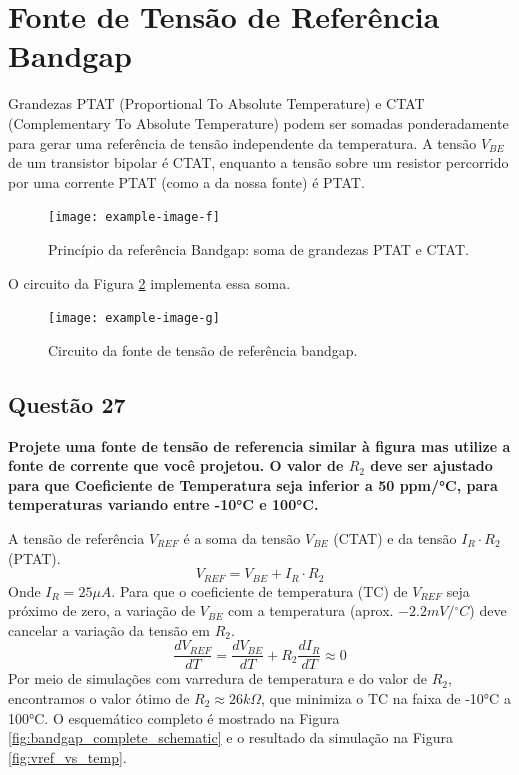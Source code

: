 ﻿\documentclass[12pt,a4paper]{article}
\newcommand{\degree}{\ensuremath{{}^\circ}}
\begin{document}
\section*{Fonte de Tensão de Referência Bandgap}

Grandezas PTAT (Proportional To Absolute Temperature) e CTAT (Complementary To Absolute Temperature) podem ser somadas ponderadamente para gerar uma referência de tensão independente da temperatura. A tensão $V_{BE}$ de um transistor bipolar é CTAT, enquanto a tensão sobre um resistor percorrido por uma corrente PTAT (como a da nossa fonte) é PTAT.

\begin{figure}[H]
\centering
\texttt{[image: example-image-f]}
\caption{Princípio da referência Bandgap: soma de grandezas PTAT e CTAT.}
\label{fig:bandgap_principle}
\end{figure}

O circuito da Figura \ref{fig:bandgap_circuit} implementa essa soma.

\begin{figure}[H]
\centering
\texttt{[image: example-image-g]}
\caption{Circuito da fonte de tensão de referência bandgap.}
\label{fig:bandgap_circuit}
\end{figure}

\subsection*{Questão 27}
\textbf{Projete uma fonte de tensão de referencia similar à figura mas utilize a fonte de corrente que você projetou. O valor de $R_2$ deve ser ajustado para que Coeficiente de Temperatura seja inferior a 50 ppm/°C, para temperaturas variando entre -10°C e 100°C.}

A tensão de referência $V_{REF}$ é a soma da tensão $V_{BE}$ (CTAT) e da tensão $I_R \cdot R_2$ (PTAT).
$$V_{REF} = V_{BE} + I_R \cdot R_2$$
Onde $I_R = 25\mu A$. Para que o coeficiente de temperatura (TC) de $V_{REF}$ seja próximo de zero, a variação de $V_{BE}$ com a temperatura (aprox. $-2.2mV/\degree C$) deve cancelar a variação da tensão em $R_2$.
$$\frac{dV_{REF}}{dT} = \frac{dV_{BE}}{dT} + R_2 \frac{dI_R}{dT} \approx 0$$
Por meio de simulações com varredura de temperatura e do valor de $R_2$, encontramos o valor ótimo de $R_2 \approx 26k\Omega$, que minimiza o TC na faixa de -10°C a 100°C. O esquemático completo é mostrado na Figura \ref{fig:bandgap_complete_schematic} e o resultado da simulação na Figura \ref{fig:vref_vs_temp}.
\end{document}
